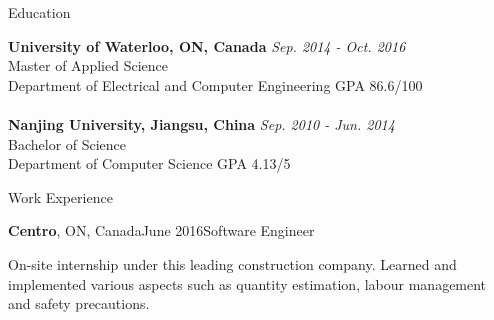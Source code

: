 \documentclass{resume} %
\begin{document}

\begin{rSection}{Education}

{\bf University of Waterloo, ON, Canada} \hfill {\em Sep. 2014 - Oct. 2016} 
\\ Master of Applied Science
\\ Department of Electrical and Computer Engineering \hfill {GPA 86.6/100}\\
\\{\bf Nanjing University, Jiangsu, China} \hfill {\em Sep. 2010 - Jun. 2014} 
\\ Bachelor of Science
\\ Department of Computer Science \hfill { GPA 4.13/5 }
\end{rSection}



\begin{rSection}{Work Experience}

\begin{rSubsection}{\textbf{Centro}, ON, Canada}{June 2016}{Software Engineer}{}
\item On-site internship under this leading construction company. Learned and implemented various aspects such as quantity estimation, labour management and safety precautions.
\end{rSubsection}


\end{rSection}
\end{document}
